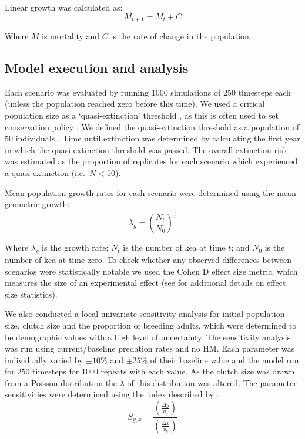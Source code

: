 \documentclass[11pt,]{article}
\begin{document}
Linear growth was calculated as: \begin{equation}
  M_{t+1} = M_{t} + C
\end{equation}

Where \(M\) is mortality and \(C\) is the rate of change in the
population.

\hypertarget{model-execution-and-analysis}{%
\subsection{Model execution and
analysis}\label{model-execution-and-analysis}}

Each scenario was evaluated by running 1000 simulations of 250 timesteps
each (unless the population reached zero before this time). We used a
critical population size as a `quasi-extinction' threshold
\citep{morris2002}, as this is often used to set conservation policy
\citep{mace1991}. We defined the quasi-extinction threshold as a
population of 50 individuals \citep{holmes2007, otway2004}. Time until
extinction was determined by calculating the first year in which the
quasi-extinction threshold was passed. The overall extinction risk was
estimated as the proportion of replicates for each scenario which
experienced a quasi-extinction (i.e.~\(N < 50\)).

Mean population growth rates for each scenario were determined using the
mean geometric growth: \begin{equation}
  \lambda_g = (\frac{N_t}{N_0})^{\frac{1}{t}}
\end{equation}

Where \(\lambda_g\) is the growth rate; \(N_t\) is the number of kea at
time \(t\); and \(N_0\) is the number of kea at time zero. To check
whether any observed differences between scenarios were statistically
notable we used the Cohen D effect size metric, which measures the size
of an experimental effect (see \citet{nakagawa2007} for additional
details on effect size statistics).

We also conducted a local univariate sensitivity analysis for initial
population size, clutch size and the proportion of breeding adults,
which were determined to be demographic values with a high level of
uncertainty. The sensitivity analysis was run using current/baseline
predation rates and no HM. Each parameter was individually varied by
\(\pm 10 \%\) and \(\pm 25 \%\) of their baseline value and the model
run for 250 timesteps for 1000 repeats with each value. As the clutch
size was drawn from a Poisson distribution the \(\lambda\) of this
distribution was altered. The parameter sensitivities were determined
using the index described by \citet{hamby1994}. \begin{equation}
  S_{y,x} = \frac{(\frac{\Delta y}{y_b})}{(\frac{\Delta x}{x_b})}
\end{equation}
\end{document}
